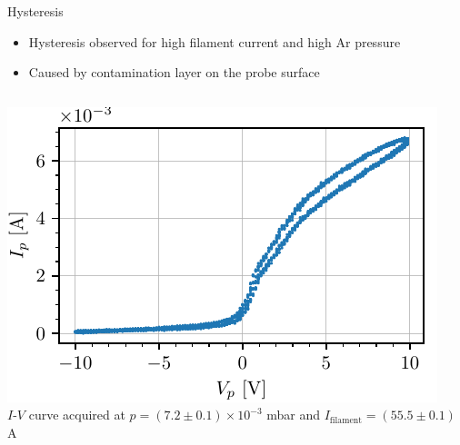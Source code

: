 \documentclass[10pt]{beamer}
\newcommand{\filamentcurrent}{\ensuremath{I_{\mathrm{filament}}}}
\begin{document}


\begin{frame}{Hysteresis}
    \begin{itemize}
        \item Hysteresis observed for high filament current and high Ar pressure
        \item Caused by contamination layer on the probe surface 
    \end{itemize}
    \vspace{-0.5cm}
    \begin{columns}[b]
        \begin{center}
            \includegraphics[scale=1]{../figures/hysteresis.pdf}\\
            \small $I$-$V$ curve acquired at $p = (7.2 \pm 0.1) \times 10^{-3}$ mbar and $\filamentcurrent = (55.5 \pm 0.1)$ A
        \end{center}


\end{columns}
\end{frame}
\end{document}
